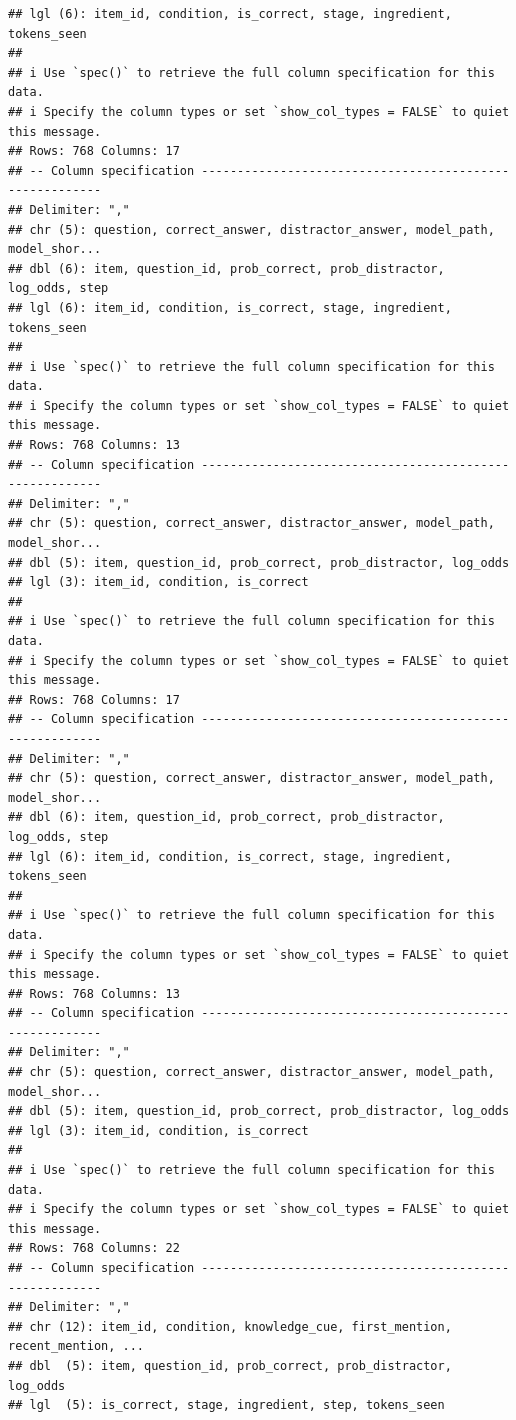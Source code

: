 \documentclass[
]{article}
\begin{document}
\begin{verbatim}
## lgl (6): item_id, condition, is_correct, stage, ingredient, tokens_seen
## 
## i Use `spec()` to retrieve the full column specification for this data.
## i Specify the column types or set `show_col_types = FALSE` to quiet this message.
## Rows: 768 Columns: 17
## -- Column specification --------------------------------------------------------
## Delimiter: ","
## chr (5): question, correct_answer, distractor_answer, model_path, model_shor...
## dbl (6): item, question_id, prob_correct, prob_distractor, log_odds, step
## lgl (6): item_id, condition, is_correct, stage, ingredient, tokens_seen
## 
## i Use `spec()` to retrieve the full column specification for this data.
## i Specify the column types or set `show_col_types = FALSE` to quiet this message.
## Rows: 768 Columns: 13
## -- Column specification --------------------------------------------------------
## Delimiter: ","
## chr (5): question, correct_answer, distractor_answer, model_path, model_shor...
## dbl (5): item, question_id, prob_correct, prob_distractor, log_odds
## lgl (3): item_id, condition, is_correct
## 
## i Use `spec()` to retrieve the full column specification for this data.
## i Specify the column types or set `show_col_types = FALSE` to quiet this message.
## Rows: 768 Columns: 17
## -- Column specification --------------------------------------------------------
## Delimiter: ","
## chr (5): question, correct_answer, distractor_answer, model_path, model_shor...
## dbl (6): item, question_id, prob_correct, prob_distractor, log_odds, step
## lgl (6): item_id, condition, is_correct, stage, ingredient, tokens_seen
## 
## i Use `spec()` to retrieve the full column specification for this data.
## i Specify the column types or set `show_col_types = FALSE` to quiet this message.
## Rows: 768 Columns: 13
## -- Column specification --------------------------------------------------------
## Delimiter: ","
## chr (5): question, correct_answer, distractor_answer, model_path, model_shor...
## dbl (5): item, question_id, prob_correct, prob_distractor, log_odds
## lgl (3): item_id, condition, is_correct
## 
## i Use `spec()` to retrieve the full column specification for this data.
## i Specify the column types or set `show_col_types = FALSE` to quiet this message.
## Rows: 768 Columns: 22
## -- Column specification --------------------------------------------------------
## Delimiter: ","
## chr (12): item_id, condition, knowledge_cue, first_mention, recent_mention, ...
## dbl  (5): item, question_id, prob_correct, prob_distractor, log_odds
## lgl  (5): is_correct, stage, ingredient, step, tokens_seen

\end{verbatim}
\end{document}
